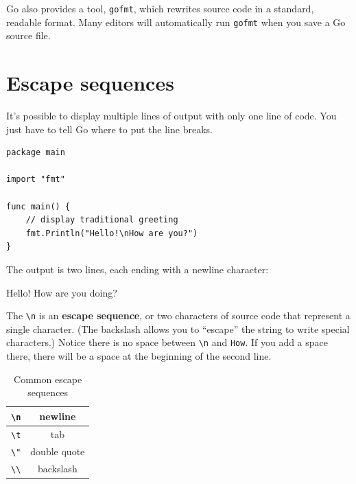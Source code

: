 Go also provides a tool, {\tt gofmt}, which rewrites source code in a standard, readable format. Many editors will automatically run {\tt gofmt} when you save a Go source file. 


\section{Escape sequences}

It's possible to display multiple lines of output with only one line of code.
You just have to tell Go where to put the line breaks.

\begin{lstlisting}
package main

import "fmt"

func main() {
	// display traditional greeting
	fmt.Println("Hello!\nHow are you?")
}
\end{lstlisting}

The output is two lines, each ending with a newline character:

\begin{stdout}
Hello!
How are you doing?
\end{stdout}


The \verb"\n" is an {\bf escape sequence}, or two characters of source code that represent a single character.
(The backslash allows you to ``escape'' the string to write special characters.)
Notice there is no space between \verb"\n" and \verb"How".
If you add a space there, there will be a space at the beginning of the second line.

\begin{table}[!ht]
\begin{center}
\begin{tabular}{|c|c|}
\hline
\verb"\n" & newline \\
\hline
\verb"\t" & tab \\
\hline
\verb'\"' & double quote \\
\hline
\verb"\\" & backslash \\
\hline
\end{tabular}
\caption{Common escape sequences}
\label{tab:escape}
\end{center}
\end{table}

